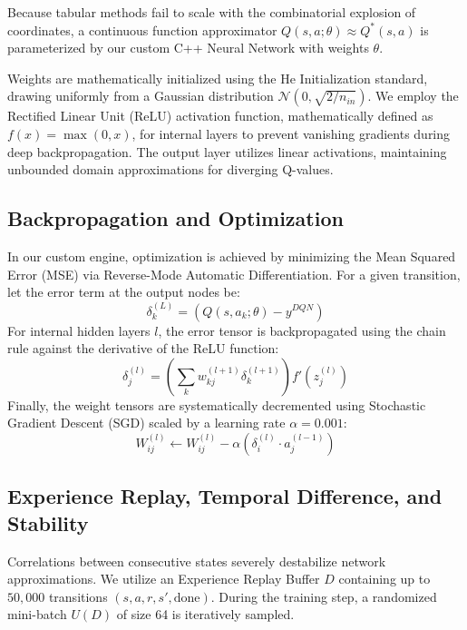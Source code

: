 \documentclass[conference]{IEEEtran}
\begin{document}
Because tabular methods fail to scale with the combinatorial explosion of coordinates, a continuous function approximator $Q(s, a; \theta) \approx Q^*(s, a)$ is parameterized by our custom C++ Neural Network with weights $\theta$.

Weights are mathematically initialized using the He Initialization standard, drawing uniformly from a Gaussian distribution $\mathcal{N}(0, \sqrt{2/n_{in}})$. We employ the Rectified Linear Unit (ReLU) activation function, mathematically defined as $f(x) = \max(0, x)$, for internal layers to prevent vanishing gradients during deep backpropagation. The output layer utilizes linear activations, maintaining unbounded domain approximations for diverging Q-values.

\subsection{Backpropagation and Optimization}
In our custom engine, optimization is achieved by minimizing the Mean Squared Error (MSE) via Reverse-Mode Automatic Differentiation. For a given transition, let the error term at the output nodes be:
\begin{equation}
\delta_k^{(L)} = (Q(s, a_k; \theta) - y^{DQN})
\end{equation}
For internal hidden layers $l$, the error tensor is backpropagated using the chain rule against the derivative of the ReLU function:
\begin{equation}
\delta_j^{(l)} = \left( \sum_{k} w_{kj}^{(l+1)} \delta_k^{(l+1)} \right) f'(z_j^{(l)})
\end{equation}
Finally, the weight tensors are systematically decremented using Stochastic Gradient Descent (SGD) scaled by a learning rate $\alpha = 0.001$:
\begin{equation}
W_{ij}^{(l)} \leftarrow W_{ij}^{(l)} - \alpha \left( \delta_i^{(l)} \cdot a_j^{(l-1)} \right)
\end{equation}

\subsection{Experience Replay, Temporal Difference, and Stability}
Correlations between consecutive states severely destabilize network approximations. We utilize an Experience Replay Buffer $D$ containing up to $50,000$ transitions $(s, a, r, s', \text{done})$. During the training step, a randomized mini-batch $U(D)$ of size 64 is iteratively sampled. 
\end{document}
